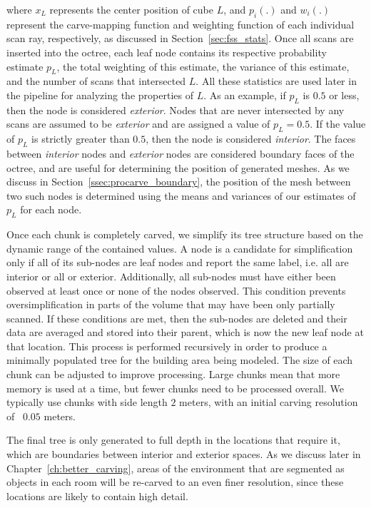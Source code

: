 \documentclass[12pt,onecolumn,oneside]{book}
\begin{document}
where $x_L$ represents the center position of cube $L$, and $p_i(.)$ and $w_i(.)$ represent the carve-mapping function and weighting function of each individual scan ray, respectively, as discussed in Section~\ref{sec:fss_stats}.  Once all scans are inserted into the octree, each leaf node contains its respective probability estimate $p_L$, the total weighting of this estimate, the variance of this estimate, and the number of scans that intersected $L$.  All these statistics are used later in the pipeline for analyzing the properties of $L$.  As an example, if $p_L$ is $0.5$ or less, then the node is considered {\it exterior}.  Nodes that are never intersected by any scans are assumed to be {\it exterior} and are assigned a value of $p_L=0.5$.  If the value of $p_L$ is strictly greater than $0.5$, then the node is considered {\it interior}.  The faces between {\it interior} nodes and {\it exterior} nodes are considered boundary faces of the octree, and are useful for determining the position of generated meshes.  As we discuss in Section~\ref{ssec:procarve_boundary}, the position of the mesh between two such nodes is determined using the means and variances of our estimates of $p_L$ for each node.

Once each chunk is completely carved, we simplify its tree structure based on the dynamic range of the contained values.  A node is a candidate for simplification only if all of its sub-nodes are leaf nodes and report the same label, i.e. all are interior or all or exterior.  Additionally, all sub-nodes must have either been observed at least once or none of the nodes observed.  This condition prevents oversimplification in parts of the volume that may have been only partially scanned.  If these conditions are met, then the sub-nodes are deleted and their data are averaged and stored into their parent, which is now the new leaf node at that location.  This process is performed recursively in order to produce a minimally populated tree for the building area being modeled.  The size of each chunk can be adjusted to improve processing.  Large chunks mean that more memory is used at a time, but fewer chunks need to be processed overall.  We typically use chunks with side length $2$ meters, with an initial carving resolution of ~$0.05$ meters.

The final tree is only generated to full depth in the locations that require it, which are boundaries between interior and exterior spaces.  As we discuss later in Chapter~\ref{ch:better_carving}, areas of the environment that are segmented as objects in each room will be re-carved to an even finer resolution, since these locations are likely to contain high detail.
\end{document}
